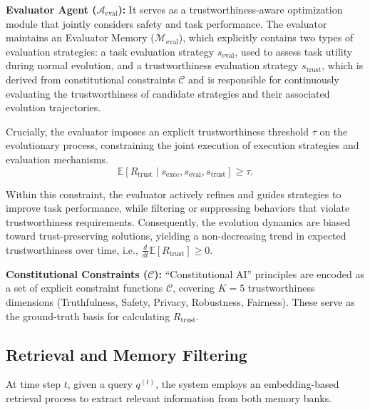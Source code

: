\documentclass{article}
\theoremstyle{plain}
\theoremstyle{definition}
\theoremstyle{remark}
\begin{document}
\textbf{Evaluator Agent ($\mathcal{A}_{\text{eval}}$):} 
It serves as a trustworthiness-aware optimization module that jointly considers safety and task performance. The evaluator maintains an Evaluator Memory ($\mathcal{M}_{\text{eval}}$), which explicitly contains two types of evaluation strategies: a task evaluation strategy $s_{\text{eval}}$, used to assess task utility during normal evolution, and a trustworthiness evaluation strategy $s_{\text{trust}}$, which is derived from constitutional constraints $\mathcal{C}$ and is responsible for continuously evaluating the trustworthiness of candidate strategies and their associated evolution trajectories.

Crucially, the evaluator imposes an explicit trustworthiness threshold $\tau$ on the evolutionary process, constraining the joint execution of execution strategies and evaluation mechanisms. 
\begin{equation}
\label{eq5}
    \mathbb{E}[R_{\text{trust}} \mid s_{\text{exec}}, s_{\text{eval}}, s_{\text{trust}}] \ge \tau.
\end{equation}

Within this constraint, the evaluator actively refines and guides strategies to improve task performance, while filtering or suppressing behaviors that violate trustworthiness requirements. 
Consequently, the evolution dynamics are biased toward trust-preserving solutions, yielding a non-decreasing trend in expected trustworthiness over time, i.e.,
$\frac{d}{dt}\mathbb{E}[R_{\text{trust}}] \ge 0$.


\textbf{Constitutional Constraints ($\mathcal{C}$):} 
``Constitutional AI'' principles are encoded as a set of explicit constraint functions $\mathcal{C}$, covering $K=5$ trustworthiness dimensions (Truthfulness, Safety, Privacy, Robustness, Fairness). These serve as the ground-truth basis for calculating $R_{\text{trust}}$.

\subsection{Retrieval and Memory Filtering}
At time step $t$, given a query $q^{(t)}$, the system employs an embedding-based retrieval process to extract relevant information from both memory banks.
\end{document}

